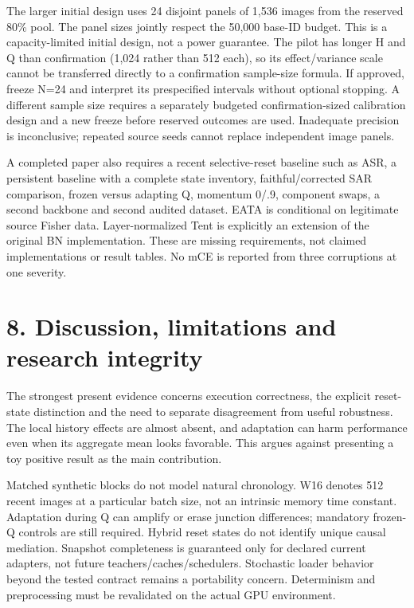 \documentclass[11pt]{article}
\begin{document}
The larger initial design uses 24 disjoint panels of 1,536 images from the reserved 80\% pool. The panel sizes jointly respect the 50,000 base-ID budget. This is a capacity-limited initial design, not a power guarantee. The pilot has longer H and Q than confirmation (1,024 rather than 512 each), so its effect/variance scale cannot be transferred directly to a confirmation sample-size formula. If approved, freeze N=24 and interpret its prespecified intervals without optional stopping. A different sample size requires a separately budgeted confirmation-sized calibration design and a new freeze before reserved outcomes are used. Inadequate precision is inconclusive; repeated source seeds cannot replace independent image panels.

A completed paper also requires a recent selective-reset baseline such as ASR, a persistent baseline with a complete state inventory, faithful/corrected SAR comparison, frozen versus adapting Q, momentum 0/.9, component swaps, a second backbone and second audited dataset. EATA is conditional on legitimate source Fisher data. Layer-normalized Tent is explicitly an extension of the original BN implementation. These are missing requirements, not claimed implementations or result tables. No mCE is reported from three corruptions at one severity.

\section*{8. Discussion, limitations and research integrity}

The strongest present evidence concerns execution correctness, the explicit reset-state distinction and the need to separate disagreement from useful robustness. The local history effects are almost absent, and adaptation can harm performance even when its aggregate mean looks favorable. This argues against presenting a toy positive result as the main contribution.

Matched synthetic blocks do not model natural chronology. W16 denotes 512 recent images at a particular batch size, not an intrinsic memory time constant. Adaptation during Q can amplify or erase junction differences; mandatory frozen-Q controls are still required. Hybrid reset states do not identify unique causal mediation. Snapshot completeness is guaranteed only for declared current adapters, not future teachers/caches/schedulers. Stochastic loader behavior beyond the tested contract remains a portability concern. Determinism and preprocessing must be revalidated on the actual GPU environment.
\end{document}
